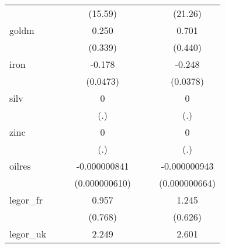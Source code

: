 {\begin{tabular}{l*{6}{c}}
            &                     &                     &     (15.59)         &                     &                     &     (21.26)         \\
[1em]
goldm       &                     &                     &       0.250         &                     &                     &       0.701         \\
            &                     &                     &     (0.339)         &                     &                     &     (0.440)         \\
[1em]
iron        &                     &                     &      -0.178\sym{**} &                     &                     &      -0.248\sym{***}\\
            &                     &                     &    (0.0473)         &                     &                     &    (0.0378)         \\
[1em]
silv        &                     &                     &           0         &                     &                     &           0         \\
            &                     &                     &         (.)         &                     &                     &         (.)         \\
[1em]
zinc        &                     &                     &           0         &                     &                     &           0         \\
            &                     &                     &         (.)         &                     &                     &         (.)         \\
[1em]
oilres      &                     &                     &-0.000000841         &                     &                     &-0.000000943         \\
            &                     &                     &(0.000000610)         &                     &                     &(0.000000664)         \\
[1em]
legor\_fr    &                     &                     &       0.957         &                     &                     &       1.245         \\
            &                     &                     &     (0.768)         &                     &                     &     (0.626)         \\
[1em]
legor\_uk    &                     &                     &       2.249\sym{**} &                     &                     &       2.601\sym{***}\\

\end{tabular}}
